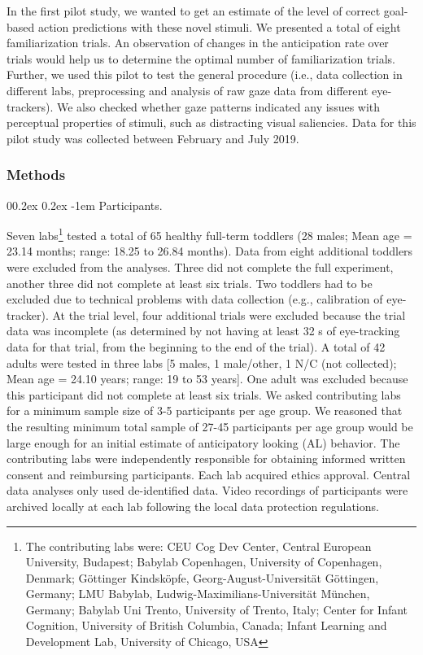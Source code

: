 \documentclass[
  man, donotrepeattitle,floatsintext]{apa6}
\makeatletter
\let\oldparagraph\paragraph
\renewcommand{\paragraph}{
    \@ifstar
      \xxxParagraphStar
      \xxxParagraphNoStar
  }
\newcommand{\xxxParagraphStar}[1]{\oldparagraph*{#1}\mbox{}}
\newcommand{\xxxParagraphNoStar}[1]{\oldparagraph{#1}\mbox{}}
\renewcommand{\paragraph}{\@startsection{paragraph}{4}{\parindent}%
  {0\baselineskip \@plus 0.2ex \@minus 0.2ex}%
  {-1em}%
  {\normalfont\normalsize\bfseries\itshape\typesectitle}}
\makeatother
\begin{document}
In the first pilot study, we wanted to get an estimate of the level of correct goal-based action predictions with these novel stimuli. We presented a total of eight familiarization trials. An observation of changes in the anticipation rate over trials would help us to determine the optimal number of familiarization trials. Further, we used this pilot to test the general procedure (i.e., data collection in different labs, preprocessing and analysis of raw gaze data from different eye-trackers). We also checked whether gaze patterns indicated any issues with perceptual properties of stimuli, such as distracting visual saliencies. Data for this pilot study was collected between February and July 2019.

\subsubsection{Methods}\label{methods}

\paragraph{Participants.}\label{participants.}

Seven labs\footnote{The contributing labs were: CEU Cog Dev Center, Central European University, Budapest; Babylab Copenhagen, University of Copenhagen, Denmark; Göttinger Kindsköpfe, Georg-August-Universität Göttingen, Germany; LMU Babylab, Ludwig-Maximilians-Universität München, Germany; Babylab Uni Trento, University of Trento, Italy; Center for Infant Cognition, University of British Columbia, Canada; Infant Learning and Development Lab, University of Chicago, USA} tested a total of 65 healthy full-term toddlers (28 males; Mean age = 23.14 months; range: 18.25 to 26.84 months). Data from eight additional toddlers were excluded from the analyses. Three did not complete the full experiment, another three did not complete at least six trials. Two toddlers had to be excluded due to technical problems with data collection (e.g., calibration of eye-tracker). At the trial level, four additional trials were excluded because the trial data was incomplete (as determined by not having at least 32 s of eye-tracking data for that trial, from the beginning to the end of the trial). A total of 42 adults were tested in three labs {[}5 males, 1 male/other, 1 N/C (not collected); Mean age = 24.10 years; range: 19 to 53 years{]}. One adult was excluded because this participant did not complete at least six trials. We asked contributing labs for a minimum sample size of 3-5 participants per age group. We reasoned that the resulting minimum total sample of 27-45 participants per age group would be large enough for an initial estimate of anticipatory looking (AL) behavior. The contributing labs were independently responsible for obtaining informed written consent and reimbursing participants. Each lab acquired ethics approval. Central data analyses only used de-identified data. Video recordings of participants were archived locally at each lab following the local data protection regulations.
\end{document}
